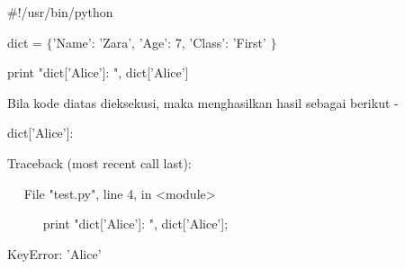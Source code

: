  \par
\noindent 
 \hspace*{0.5in}  $  \#  $!/usr/bin/python \par
\vspace{12pt}
\noindent 
 \hspace*{0.5in} dict =  $  \{  $'Name': 'Zara', 'Age': 7, 'Class': 'First' $  \}  $ \par
\vspace{12pt}
\noindent 
 \hspace*{0.5in} print "dict['Alice']: ", dict['Alice'] \par
\begin{adjustwidth}{0.03in}{0.03in}
Bila kode diatas dieksekusi, maka menghasilkan hasil sebagai berikut -\end{adjustwidth}
 \par
\noindent 
{\fontsize{9pt}{9pt}\selectfont  \hspace*{0.5in} dict['Alice']:} \par
\noindent 
{\fontsize{9pt}{9pt}\selectfont  \hspace*{0.5in} Traceback (most recent call last):} \par
\noindent 
{\fontsize{9pt}{9pt}\selectfont  \hspace*{0.5in} ~~ File "test.py", line 4, in <module>} \par
\noindent 
{\fontsize{9pt}{9pt}\selectfont ~~~~~  \hspace*{0.5in}  \hspace*{0.5in} print "dict['Alice']: ", dict['Alice'];} \par
\noindent 
{\fontsize{9pt}{9pt}\selectfont  \hspace*{0.5in}  \hspace*{0.5in} KeyError: 'Alice'} \par
\vspace{12pt}
\vspace{12pt}
